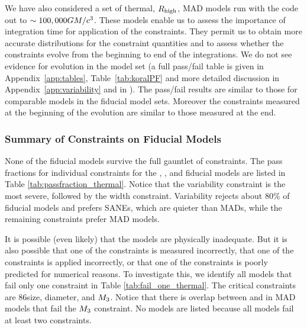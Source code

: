 We have also considered a set of thermal, $R_\mathrm{high}$, MAD models run with the \koral code out to $\sim 100,000GM/c^3$.
These models enable us to assess the importance of integration time for application of the constraints.
They permit us to obtain more accurate distributions for the constraint quantities and to assess whether the constraints evolve from the beginning to end of the integrations.
We do not see evidence for evolution in the \koral model set (a full pass/fail table is given in Appendix~\ref{app:tables}, Table~\ref{tab:koralPF} and more detailed discussion in Appendix~\ref{app:variability} and in \citet{Georgiev_2022}).
The \koral pass/fail results are similar to those for comparable models in the fiducial model sets.
Moreover the constraints measured at the beginning of the evolution are similar to those measured at the end.

\subsubsection{Summary of Constraints on Fiducial Models}
\label{sec:summarythermal}





None of the fiducial models  survive the full gauntlet of constraints.
The pass fractions for individual constraints for the \bhac, \kharma, and \hamr fiducial models are listed in Table \ref{tab:passfraction_thermal}.
Notice that the variability constraint is the most severe, followed by the \mring width constraint.
Variability rejects about $80\%$ of fiducial models and prefers SANEs, which are quieter than MADs, while the remaining constraints prefer MAD models.

It is possible (even likely) that the models are physically inadequate.
But it is also possible that one of the constraints is measured incorrectly, that one of the constraints is applied incorrectly, or that one of the constraints is poorly predicted for numerical reasons.
To investigate this, we identify all models that fail only one constraint in Table \ref{tab:fail_one_thermal}.
The critical constraints are 86\GHz size, \mring diameter, and $M_{3}$.
Notice that there is overlap between \kharma and \bhac in MAD models that fail the $M_{3}$ constraint.
No \hamr models are listed because all \hamr models fail at least two constraints.

